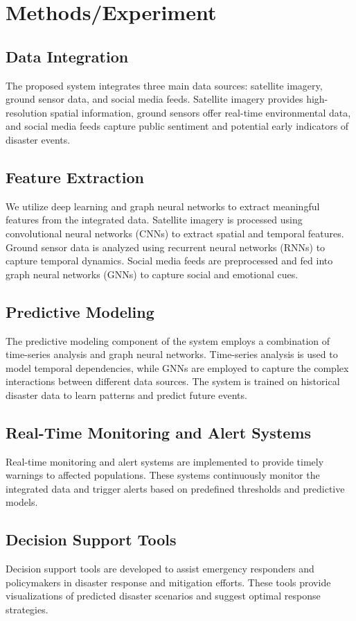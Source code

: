 \documentclass{article}
\begin{document}
\section{Methods/Experiment}
\subsection{Data Integration}
The proposed system integrates three main data sources: satellite imagery, ground sensor data, and social media feeds. Satellite imagery provides high-resolution spatial information, ground sensors offer real-time environmental data, and social media feeds capture public sentiment and potential early indicators of disaster events.

\subsection{Feature Extraction}
We utilize deep learning and graph neural networks to extract meaningful features from the integrated data. Satellite imagery is processed using convolutional neural networks (CNNs) to extract spatial and temporal features. Ground sensor data is analyzed using recurrent neural networks (RNNs) to capture temporal dynamics. Social media feeds are preprocessed and fed into graph neural networks (GNNs) to capture social and emotional cues.

\subsection{Predictive Modeling}
The predictive modeling component of the system employs a combination of time-series analysis and graph neural networks. Time-series analysis is used to model temporal dependencies, while GNNs are employed to capture the complex interactions between different data sources. The system is trained on historical disaster data to learn patterns and predict future events.

\subsection{Real-Time Monitoring and Alert Systems}
Real-time monitoring and alert systems are implemented to provide timely warnings to affected populations. These systems continuously monitor the integrated data and trigger alerts based on predefined thresholds and predictive models.

\subsection{Decision Support Tools}
Decision support tools are developed to assist emergency responders and policymakers in disaster response and mitigation efforts. These tools provide visualizations of predicted disaster scenarios and suggest optimal response strategies.
\end{document}
